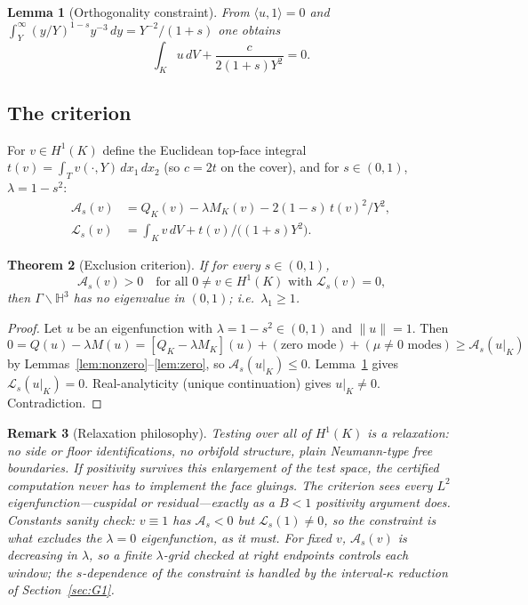 \documentclass[11pt]{amsart}
\newtheorem{theorem}{Theorem}[section]
\newtheorem{lemma}[theorem]{Lemma}
\newtheorem{remark}[theorem]{Remark}
\newcommand{\HH}{\mathbb{H}^3}
\begin{document}
\begin{lemma}[Orthogonality constraint]\label{lem:ortho}
From $\langle u,1\rangle=0$ and
$\int_Y^\infty(y/Y)^{1-s}y^{-3}\,dy=Y^{-2}/(1+s)$ one obtains
\[
  \int_K u\,dV+\frac{c}{2(1+s)Y^2}=0.
\]
\end{lemma}

\subsection{The criterion}

For $v\in H^1(K)$ define the Euclidean top-face integral
$t(v)=\int_T v(\cdot,Y)\,dx_1\,dx_2$ (so $c=2t$ on the cover), and for
$s\in(0,1)$, $\lambda=1-s^2$:
\begin{align*}
  \mathcal{A}_s(v)
    &= Q_K(v)-\lambda M_K(v)-2(1-s)\,t(v)^2/Y^2,\\
  \mathcal{L}_s(v)
    &= \int_K v\,dV+t(v)/\bigl((1+s)Y^2\bigr).
\end{align*}

\begin{theorem}[Exclusion criterion]\label{thm:criterion}
If for every $s\in(0,1)$,
\[
  \mathcal{A}_s(v)>0
  \quad\text{for all $0\neq v\in H^1(K)$ with $\mathcal{L}_s(v)=0$,}
\]
then $\Gamma\backslash\HH$ has no eigenvalue in $(0,1)$; i.e.\
$\lambda_1\ge 1$.
\end{theorem}

\begin{proof}
Let $u$ be an eigenfunction with $\lambda=1-s^2\in(0,1)$ and $\|u\|=1$.
Then
\[
  0=Q(u)-\lambda M(u)
  =[Q_K-\lambda M_K](u)+(\text{zero mode})+(\mu\neq 0\text{ modes})
  \ge\mathcal{A}_s(u|_K)
\]
by Lemmas~\ref{lem:nonzero}--\ref{lem:zero}, so $\mathcal{A}_s(u|_K)\le 0$.
Lemma~\ref{lem:ortho} gives $\mathcal{L}_s(u|_K)=0$.  Real-analyticity
(unique continuation) gives $u|_K\neq 0$.  Contradiction.
\end{proof}

\begin{remark}[Relaxation philosophy]
Testing over \emph{all} of $H^1(K)$ is a relaxation: no side or floor
identifications, no orbifold structure, plain Neumann-type free
boundaries.  If positivity survives this enlargement of the test space,
the certified computation never has to implement the face gluings.  The
criterion sees every $L^2$ eigenfunction---cuspidal or residual---exactly
as a $B<1$ positivity argument does.  Constants sanity check:
$v\equiv 1$ has $\mathcal{A}_s<0$ but $\mathcal{L}_s(1)\neq 0$, so the
constraint is what excludes the $\lambda=0$ eigenfunction, as it must.
For fixed $v$, $\mathcal{A}_s(v)$ is decreasing in $\lambda$, so a finite
$\lambda$-grid checked at right endpoints controls each window; the
$s$-dependence of the constraint is handled by the interval-$\kappa$
reduction of Section~\ref{sec:G1}.
\end{remark}
\end{document}

